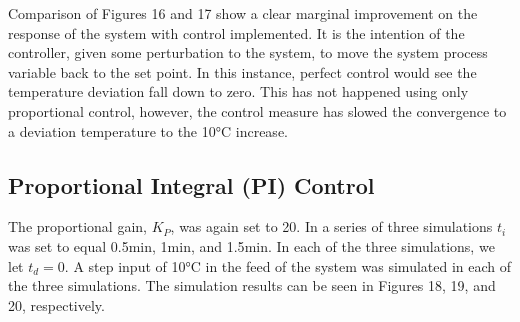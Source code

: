 \documentclass{article}
\begin{document}
Comparison of Figures 16 and 17 show a clear marginal improvement on the response of the system with control implemented. It is the intention of the controller, given some perturbation to the system, to move the system process variable back to the set point. In this instance, perfect control would see the temperature deviation fall down to zero. This has not happened using only proportional control, however, the control measure has slowed the convergence to a deviation temperature to the 10$\si{\degreeCelsius}$ increase. 


\subsection{Proportional Integral (PI) Control}
The proportional gain, $K_P$, was again set to 20. In a series of three simulations $t_i$ was set to equal 0.5$\si{\minute}$, 1$\si{\minute}$, and 1.5$\si{\minute}$. In each of the three simulations, we let $t_d = 0$. A step input of 10$\si{\degreeCelsius}$ in the feed of the system was simulated in each of the three simulations. The simulation results can be seen in Figures 18, 19, and 20, respectively.
\end{document}
